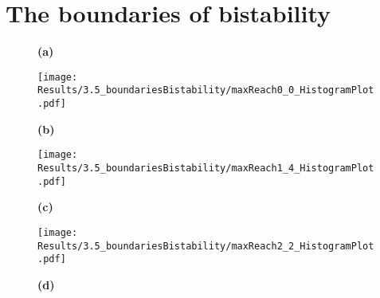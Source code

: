     \section{The boundaries of bistability}
        \label{sec:ResBoundariesBistability}
        \begin{figure}[htpb!]
            \centering
            \begin{minipage}{0.77\textwidth}
                \begin{minipage}{0.1\textwidth}
                    \caption*{\small \textbf{(a)}}
                \end{minipage}
                \begin{minipage}{0.66\textwidth}
                    \texttt{[image: Results/3.5\_boundariesBistability/maxReach0\_0\_HistogramPlot.pdf]}
                \end{minipage}
            \end{minipage}
            \begin{minipage}{0.77\textwidth}
                \begin{minipage}{0.1\textwidth}
                    \caption*{\small \textbf{(b)}}
                \end{minipage}
                \begin{minipage}{0.66\textwidth}
                    \texttt{[image: Results/3.5\_boundariesBistability/maxReach1\_4\_HistogramPlot.pdf]}
                \end{minipage}
            \end{minipage}
            \begin{minipage}{0.77\textwidth}
                \begin{minipage}{0.1\textwidth}
                    \caption*{\small \textbf{(c)}}
                \end{minipage}
                \begin{minipage}{0.66\textwidth}
                    \texttt{[image: Results/3.5\_boundariesBistability/maxReach2\_2\_HistogramPlot.pdf]}
                \end{minipage}
            \end{minipage}
            \begin{minipage}{0.77\textwidth}
                \begin{minipage}{0.1\textwidth}
                    \caption*{\small \textbf{(d)}}

\end{minipage}
\end{minipage}
\end{figure}
